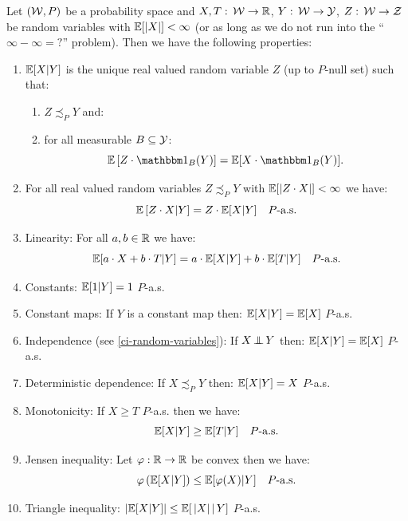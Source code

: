 \begin{Thm}
 Let $(\mathcal{W},P)$ be a probability space
 and $X,T:\, \mathcal{W} \to \mathbb{R}$, $Y:\,\mathcal{W} \to \mathcal{Y}$, $Z:\, \mathcal{W} \to \mathcal{Z}$ be random variables with $\mathbb{E}[|X|]< \infty$ (or as long as we do not run into the ``$\infty - \infty=?$'' problem).
    Then we have the following properties:
    \begin{enumerate}
        \item $\mathbb{E}[X|Y]$ is the unique real valued random variable $Z$ (up to $P$-null set)  such that: 
            \begin{enumerate}
                \item $Z \precsim_P Y$ and:
                \item 
            for all measurable $B \subseteq \mathcal{Y}$:            
            \[ \E\lB Z \cdot \I_B(Y) \rB = \E[ X \cdot \I_B(Y)].  \]
            \end{enumerate}
        \item  For all real valued random variables $Z \precsim_P Y$  with $\mathbb{E}[|Z \cdot X|]< \infty$ we have:
            \[ \mathbb{E}\left [ Z \cdot X|Y \right ] = Z \cdot \mathbb{E}[X|Y] \quad P\text{-a.s.}  \]
        \item Linearity: For all $a,b \in \mathbb{R}$ we have:
            \[ \mathbb{E}[ a \cdot X + b\cdot T|Y] = a \cdot \mathbb{E}[X|Y] + b\cdot\mathbb{E}[T|Y] \quad P\text{-a.s.}  \]
        \item Constants: $\mathbb{E}[1|Y] = 1$ $P$-a.s.
        \item Constant maps: If $Y$ is a constant map then: $\mathbb{E}[X|Y] = \mathbb{E}[X]$ $P$-a.s.
        \item Independence (see \ref{ci-random-variables}): If $X \operatorname*{\perp\mkern-11mu\perp} Y$ then: $\mathbb{E}[X|Y] = \mathbb{E}[X]$ $P$-a.s.    
        \item Deterministic dependence: If $X \precsim_P Y$ then: $\mathbb{E}[X|Y] = X$ $P$-a.s.   
        \item Monotonicity: If $ X \ge T$ $P$-a.s. then we have:
            \[ \mathbb{E}[X|Y] \ge  \mathbb{E}[T|Y] \quad P\text{-a.s.}    \]
        \item Jensen inequality: Let $\varphi: \mathbb{R} \to \mathbb{R}$ be convex then we have:
            \[ \varphi\left ( \mathbb{E}[X|Y]\right ) \le \mathbb{E}[ \varphi(X)|Y] \quad P\text{-a.s.}   \]
        \item Triangle inequality: $|\mathbb{E}[X|Y]| \le \mathbb{E}[\,|X|\,|\, Y]$ $P$-a.s.

\end{enumerate}
\end{Thm}
